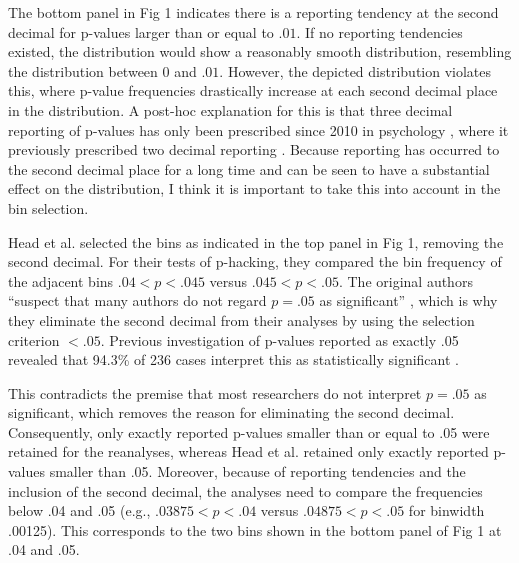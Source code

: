 The bottom panel in Fig 1 indicates there is a reporting tendency at the second decimal for p-values larger than or equal to $.01$. If no reporting tendencies existed, the distribution would show a reasonably smooth distribution, resembling the distribution between $0$ and $.01$. However, the depicted distribution violates this, where p-value frequencies drastically increase at each second decimal place in the distribution. A post-hoc explanation for this is that three decimal reporting of p-values has only been prescribed since 2010 in psychology \cite{American_Psychological_Association2010-qe}, where it previously prescribed two decimal reporting \cite{American_Psychological_Association1983-yf, American_Psychological_Association2001-uw}. Because reporting has occurred to the second decimal place for a long time and can be seen to have a substantial effect on the distribution, I think it is important to take this into account in the bin selection.

Head et al. selected the bins as indicated in the top panel in Fig 1, removing the second decimal. For their tests of p-hacking, they compared the bin frequency of the adjacent bins $.04<p<.045$ versus $.045<p<.05$. The original authors “suspect that many authors do not regard $p=.05$ as significant” \cite{Head_2015}, which is why they eliminate the second decimal from their analyses by using the selection criterion $<.05$. Previous investigation of p-values reported as exactly .05 revealed that 94.3\% of 236 cases interpret this as statistically significant \cite{Nuijten2015}.

This contradicts the premise that most researchers do not interpret $p=.05$ as significant, which removes the reason for eliminating the second decimal. Consequently, only exactly reported p-values smaller than or equal to .05 were retained for the reanalyses, whereas Head et al. retained only exactly reported p-values smaller than .05. Moreover, because of reporting tendencies and the inclusion of the second decimal, the analyses need to compare the frequencies below .04 and .05 (e.g., $.03875<p<.04$ versus $.04875<p<.05$ for binwidth .00125). This corresponds to the two bins shown in the bottom panel of Fig 1 at .04 and .05.

